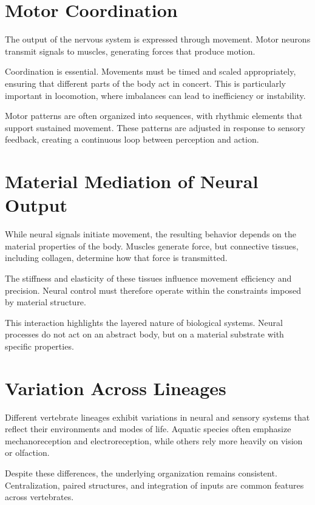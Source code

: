 \documentclass[11pt,oneside]{book}
\begin{document}
\section{Motor Coordination}

The output of the nervous system is expressed through movement. Motor neurons transmit signals to muscles, generating forces that produce motion.

Coordination is essential. Movements must be timed and scaled appropriately, ensuring that different parts of the body act in concert. This is particularly important in locomotion, where imbalances can lead to inefficiency or instability.

Motor patterns are often organized into sequences, with rhythmic elements that support sustained movement. These patterns are adjusted in response to sensory feedback, creating a continuous loop between perception and action.

\section{Material Mediation of Neural Output}

While neural signals initiate movement, the resulting behavior depends on the material properties of the body. Muscles generate force, but connective tissues, including collagen, determine how that force is transmitted.

The stiffness and elasticity of these tissues influence movement efficiency and precision. Neural control must therefore operate within the constraints imposed by material structure.

This interaction highlights the layered nature of biological systems. Neural processes do not act on an abstract body, but on a material substrate with specific properties.

\section{Variation Across Lineages}

Different vertebrate lineages exhibit variations in neural and sensory systems that reflect their environments and modes of life. Aquatic species often emphasize mechanoreception and electroreception, while others rely more heavily on vision or olfaction.

Despite these differences, the underlying organization remains consistent. Centralization, paired structures, and integration of inputs are common features across vertebrates.
\end{document}
